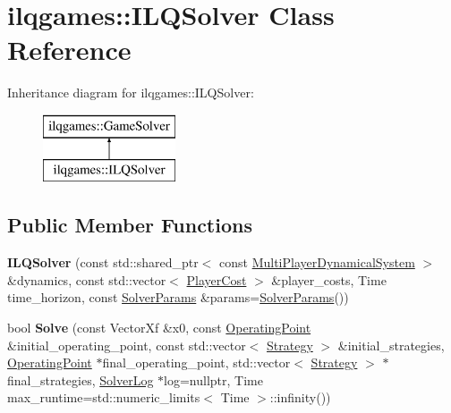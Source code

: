 \hypertarget{classilqgames_1_1_i_l_q_solver}{}\section{ilqgames\+:\+:I\+L\+Q\+Solver Class Reference}
\label{classilqgames_1_1_i_l_q_solver}
Inheritance diagram for ilqgames\+:\+:I\+L\+Q\+Solver\+:\begin{figure}[H]
\begin{center}
\leavevmode
\includegraphics[height=2.000000cm]{classilqgames_1_1_i_l_q_solver}
\end{center}
\end{figure}
\subsection*{Public Member Functions}
\begin{DoxyCompactItemize}
\item 
{\bfseries I\+L\+Q\+Solver} (const std\+::shared\+\_\+ptr$<$ const \hyperlink{classilqgames_1_1_multi_player_dynamical_system}{Multi\+Player\+Dynamical\+System} $>$ \&dynamics, const std\+::vector$<$ \hyperlink{classilqgames_1_1_player_cost}{Player\+Cost} $>$ \&player\+\_\+costs, Time time\+\_\+horizon, const \hyperlink{structilqgames_1_1_solver_params}{Solver\+Params} \&params=\hyperlink{structilqgames_1_1_solver_params}{Solver\+Params}())\hypertarget{classilqgames_1_1_i_l_q_solver_a8b93b29aea1dc01c06e1b33a9a08a3b6}{}\label{classilqgames_1_1_i_l_q_solver_a8b93b29aea1dc01c06e1b33a9a08a3b6}

\item 
bool {\bfseries Solve} (const Vector\+Xf \&x0, const \hyperlink{structilqgames_1_1_operating_point}{Operating\+Point} \&initial\+\_\+operating\+\_\+point, const std\+::vector$<$ \hyperlink{structilqgames_1_1_strategy}{Strategy} $>$ \&initial\+\_\+strategies, \hyperlink{structilqgames_1_1_operating_point}{Operating\+Point} $\ast$final\+\_\+operating\+\_\+point, std\+::vector$<$ \hyperlink{structilqgames_1_1_strategy}{Strategy} $>$ $\ast$final\+\_\+strategies, \hyperlink{classilqgames_1_1_solver_log}{Solver\+Log} $\ast$log=nullptr, Time max\+\_\+runtime=std\+::numeric\+\_\+limits$<$ Time $>$\+::infinity())\hypertarget{classilqgames_1_1_i_l_q_solver_aad99e04f6f16581cf1e43da68be83eee}{}\label{classilqgames_1_1_i_l_q_solver_aad99e04f6f16581cf1e43da68be83eee}

\end{DoxyCompactItemize}
